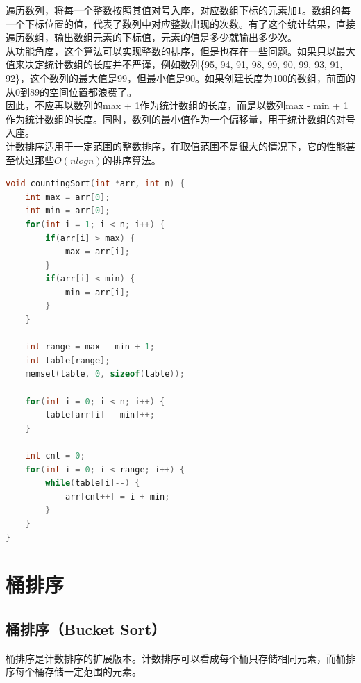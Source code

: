 遍历数列，将每一个整数按照其值对号入座，对应数组下标的元素加1。数组的每一个下标位置的值，代表了数列中对应整数出现的次数。有了这个统计结果，直接遍历数组，输出数组元素的下标值，元素的值是多少就输出多少次。 \\

从功能角度，这个算法可以实现整数的排序，但是也存在一些问题。如果只以最大值来决定统计数组的长度并不严谨，例如数列\{95, 94, 91, 98, 99, 90, 99, 93, 91, 92\}，这个数列的最大值是99，但最小值是90。如果创建长度为100的数组，前面的从0到89的空间位置都浪费了。 \\

因此，不应再以数列的max + 1作为统计数组的长度，而是以数列max - min + 1作为统计数组的长度。同时，数列的最小值作为一个偏移量，用于统计数组的对号入座。 \\

计数排序适用于一定范围的整数排序，在取值范围不是很大的情况下，它的性能甚至快过那些$ O(nlogn) $的排序算法。 \\


\begin{lstlisting}[language=C]
void countingSort(int *arr, int n) {
    int max = arr[0];
    int min = arr[0];
    for(int i = 1; i < n; i++) {
        if(arr[i] > max) {
            max = arr[i];
        }
        if(arr[i] < min) {
            min = arr[i];
        }
    }
    
    int range = max - min + 1;
    int table[range];
    memset(table, 0, sizeof(table));

    for(int i = 0; i < n; i++) {
        table[arr[i] - min]++;
    }

    int cnt = 0;
    for(int i = 0; i < range; i++) {
        while(table[i]--) {
            arr[cnt++] = i + min;
        }
    }
}
\end{lstlisting}

\newpage

\section{桶排序}

\subsection{桶排序（Bucket Sort）}

桶排序是计数排序的扩展版本。计数排序可以看成每个桶只存储相同元素，而桶排序每个桶存储一定范围的元素。 \\

